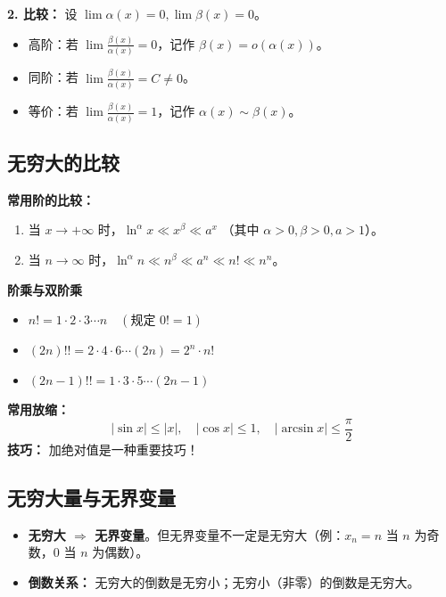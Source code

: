 \documentclass[a4paper,12pt]{ctexart}
\newenvironment{rednote}
  {\begin{tcolorbox}[colback=notepurple, colframe=highlightred, boxrule=1pt, title=\textbf{重点/技巧/手写笔记}]}
  {\end{tcolorbox}}
\begin{document}
\textbf{2. 比较：} 设 $\lim \alpha(x) = 0, \lim \beta(x) = 0$。
\begin{itemize}
    \item 高阶：若 $\lim \frac{\beta(x)}{\alpha(x)} = 0$，记作 $\beta(x) = o(\alpha(x))$。
    \item 同阶：若 $\lim \frac{\beta(x)}{\alpha(x)} = C \neq 0$。
    \item 等价：若 $\lim \frac{\beta(x)}{\alpha(x)} = 1$，记作 $\alpha(x) \sim \beta(x)$。
\end{itemize}

\subsection{无穷大的比较}
\textbf{常用阶的比较：}
\begin{enumerate}
    \item 当 $x \to +\infty$ 时，$\ln^\alpha x \ll x^\beta \ll a^x$ （其中 $\alpha > 0, \beta > 0, a > 1$）。
    \item 当 $n \to \infty$ 时，$\ln^\alpha n \ll n^\beta \ll a^n \ll n! \ll n^n$。
\end{enumerate}

\begin{rednote}
    \textbf{阶乘与双阶乘}
    \begin{itemize}
        \item $n! = 1 \cdot 2 \cdot 3 \cdots n \quad (\text{规定 } 0! = 1)$
        \item $(2n)!! = 2 \cdot 4 \cdot 6 \cdots (2n) = 2^n \cdot n!$
        \item $(2n-1)!! = 1 \cdot 3 \cdot 5 \cdots (2n-1)$
    \end{itemize}
    \textbf{常用放缩：}
    \[ |\sin x| \leqslant |x|, \quad |\cos x| \leqslant 1, \quad |\arcsin x| \leqslant \frac{\pi}{2} \]
    \textbf{技巧：} 加绝对值是一种重要技巧！
\end{rednote}

\subsection{无穷大量与无界变量}
\begin{itemize}
    \item \textbf{无穷大 $\Rightarrow$ 无界变量}。但无界变量不一定是无穷大（例：$x_n = n$ 当 $n$ 为奇数，$0$ 当 $n$ 为偶数）。
    \item \textbf{倒数关系：} 无穷大的倒数是无穷小；无穷小（非零）的倒数是无穷大。
\end{itemize}
\end{document}
